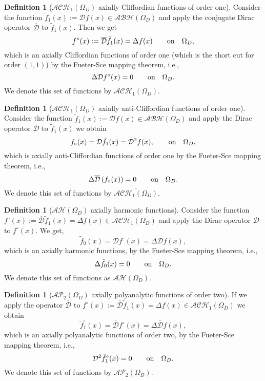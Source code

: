 \documentclass[reqno,11pt]{amsart}
\numberwithin{equation}{section}
\theoremstyle{definition}
\newtheorem{definition}[theorem]{Definition}
\begin{document}
\begin{definition}[$\mathcal{ACH}_1(\Omega_D)$ axially Cliffordian functions of order one]
Consider the function  $\tilde{f}_1(x):= \mathcal{D}f(x)\in  \mathcal{ABH}(\Omega_D)$ and
apply the conjugate Dirac operator $ \mathcal{\overline{D}}$ to $\tilde{f}_1(x)$. Then we get
	\begin{equation}
		\label{cliff}
		f^{\circ}(x):= \mathcal{\overline{D}}\tilde{f}_1(x)=\Delta f(x)\qquad \hbox{on} \quad \Omega_D,
	\end{equation}
	which is an axially Cliffordian functions of order one (which is the short cut for order $(1,1)$)
by the Fueter-Sce mapping theorem, i.e.,
	$$ \Delta \mathcal{D} f^{\circ}(x)=0\qquad \hbox{on} \quad \Omega_D.$$
We denote this set of functions by $\mathcal{ACH}_1(\Omega_D)$.
\end{definition}


\begin{definition}[$\overline{\mathcal{ACH}_1(\Omega_D)}$ axially anti-Cliffordian functions of order one]
Consider the function  $\tilde{f}_1(x):= \mathcal{D}f(x)\in  \mathcal{ABH}(\Omega_D)$ and
apply the  Dirac operator $ \mathcal{{D}}$ to $\tilde{f}_1(x)$ we obtain
$$
f_{\circ}(x)=\mathcal{D}\tilde{f}_1(x)= \mathcal{D}^2 f(x),\qquad \hbox{on} \quad \Omega_D,
$$
	which is axially anti-Cliffordian functions of order one
by the Fueter-Sce mapping theorem, i.e.,
	$$ \Delta \mathcal{\overline{D}} \left(f_{\circ}(x)\right)=0 \qquad \hbox{on} \quad \Omega_D.$$
We denote this set of functions by $\overline{\mathcal{ACH}_1(\Omega_D)}$.
\end{definition}





\begin{definition}[$\mathcal{AH}(\Omega_D)$ axially harmonic functions]

Consider the function
$f^{\circ}(x):= \mathcal{\overline{D}}\tilde{f}_1(x)=\Delta f(x)\in \mathcal{ACH}_1(\Omega_D)$ and
 apply the Dirac operator $ \mathcal{D}$ to $f^{\circ}(x)$. We get,
	$$\tilde{f}_0(x)=  \mathcal{D}f^{\circ}(x)=\Delta \mathcal{D} f(x),$$
	which is an axially harmonic functions,  by the Fueter-Sce mapping theorem, i.e.,
	$$ \Delta \tilde{f}_0(x)=0 \qquad \hbox{on} \quad \Omega_D.$$
We denote this set of functions as $ \mathcal{AH}(\Omega_D)$.
	

\end{definition}
  \begin{definition}[$\mathcal{AP}_2( \Omega_D)$ axially polyanalytic functions of order two]
  If we apply the operator $ \mathcal{\overline{D}}$ to
  $f^{\circ}(x):= \mathcal{\overline{D}}\tilde{f}_1(x)=\Delta f(x)\in \mathcal{ACH}_1(\Omega_D)$ we obtain
	$$
\breve{f}^{\circ}_1(x)=  \mathcal{\overline{D}}f^{\circ}(x)=\Delta \mathcal{\overline{D}} f(x),
$$
	which is an axially polyanalytic functions of order two,
by the Fueter-Sce mapping theorem, i.e.,
	$$ \mathcal{D}^2 \breve{f}^{\circ}_1(x)=0 \qquad \hbox{on} \quad \Omega_D.$$
We denote this set of functions by $\mathcal{AP}_2( \Omega_D)$.
\end{definition}
\end{document}
